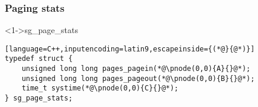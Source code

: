 \documentclass[ngerman,xcolor={table,dvipsnames},smaller,compress,hyperref={bookmarks,colorlinks}]{beamer}
\begin{document}
\begin{frame}[fragile]
\frametitle{Paging stats}
\begin{block}<1->{sg\_page\_stats}
\tiny
\begin{lstlisting}[language=C++,inputencoding=latin9,escapeinside={(*@}{@*)}]
typedef struct {
    unsigned long long pages_pagein(*@\pnode(0,0){A}{}@*);
    unsigned long long pages_pageout(*@\pnode(0,0){B}{}@*);
    time_t systime(*@\pnode(0,0){C}{}@*);
} sg_page_stats;
\end{lstlisting}
\end{block}

\scriptsize
{}
\begin{itemize}
\end{itemize}
\end{frame}
\end{document}
